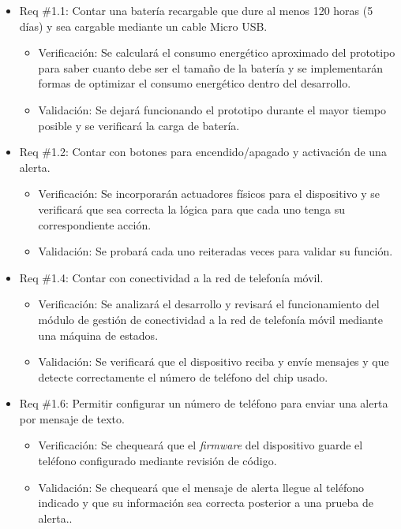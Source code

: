 \documentclass[
11pt, %
]{charter}
\begin{document}
\begin{itemize} 
\item Req \#1.1: Contar una batería recargable que dure al menos 120 horas (5 días) y sea cargable mediante un cable Micro USB.

\begin{itemize}
	\item Verificación: Se calculará el consumo energético aproximado del prototipo para saber cuanto debe ser el tamaño de la batería y se implementarán formas de optimizar el consumo energético dentro del desarrollo.
	\item Validación: Se dejará funcionando el prototipo durante el mayor tiempo posible y se verificará la carga de batería.
\end{itemize}

\item Req \#1.2: Contar con botones para encendido/apagado y activación de una alerta.

\begin{itemize}
	\item Verificación: Se incorporarán actuadores físicos para el dispositivo y se verificará que sea correcta la lógica para que cada uno tenga su correspondiente acción.
	\item Validación: Se probará cada uno reiteradas veces para validar su función.
\end{itemize}

\item Req \#1.4: Contar con conectividad a la red de telefonía móvil.

\begin{itemize}
	\item Verificación: Se analizará el desarrollo y revisará el funcionamiento del módulo de gestión de conectividad a la red de telefonía móvil mediante una máquina de estados.
	\item Validación: Se verificará que el dispositivo reciba y envíe mensajes y que detecte correctamente el número de teléfono del chip usado.
\end{itemize}

\item Req \#1.6: Permitir configurar un número de teléfono para enviar una alerta por mensaje de texto.

\begin{itemize}
	\item Verificación: Se chequeará que el \textit{firmware} del dispositivo guarde el teléfono configurado mediante revisión de código.
	\item Validación: Se chequeará que el mensaje de alerta llegue al teléfono indicado y que su información sea correcta posterior a una prueba de alerta..
\end{itemize}


\end{itemize}
\end{document}
